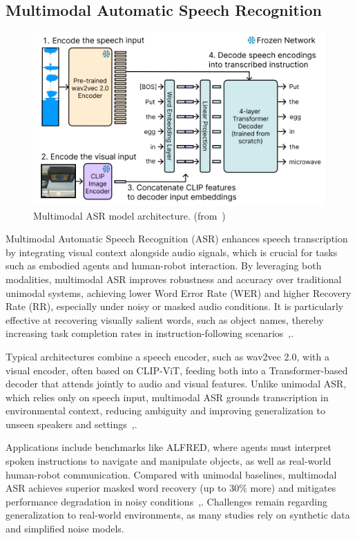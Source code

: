\documentclass[12pt]{extarticle}
\begin{document}
\subsection{Multimodal Automatic Speech Recognition}

\begin{figure}[htbp]
    \centering
    \includegraphics[width=0.8\linewidth]{asr}
    \caption{Multimodal ASR model architecture.
    (from~\cite{Chang2023})}
    \label{fig:asr}
\end{figure}

Multimodal Automatic Speech Recognition (ASR) enhances speech transcription by integrating visual context alongside audio signals, which is crucial for tasks such as embodied agents and human-robot interaction. By leveraging both modalities, multimodal ASR improves robustness and accuracy over traditional unimodal systems, achieving lower Word Error Rate (WER) and higher Recovery Rate (RR), especially under noisy or masked audio conditions. It is particularly effective at recovering visually salient words, such as object names, thereby increasing task completion rates in instruction-following scenarios~\cite{Chang2023},\cite{multi}.

Typical architectures combine a speech encoder, such as wav2vec 2.0, with a visual encoder, often based on CLIP-ViT, feeding both into a Transformer-based decoder that attends jointly to audio and visual features. Unlike unimodal ASR, which relies only on speech input, multimodal ASR grounds transcription in environmental context, reducing ambiguity and improving generalization to unseen speakers and settings~\cite{Chang2023},\cite{multi}.

Applications include benchmarks like ALFRED, where agents must interpret spoken instructions to navigate and manipulate objects, as well as real-world human-robot communication. Compared with unimodal baselines, multimodal ASR achieves superior masked word recovery (up to 30\% more) and mitigates performance degradation in noisy conditions~\cite{Chang2023},\cite{multi}. Challenges remain regarding generalization to real-world environments, as many studies rely on synthetic data and simplified noise models.
\end{document}
